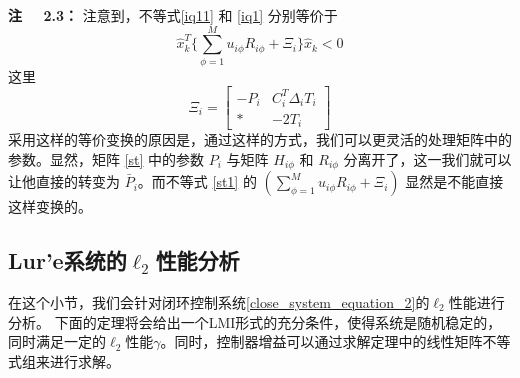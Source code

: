 	{\bf 注 \ \ 2.3：} 
	注意到，不等式\eqref{iq11} 和 \eqref{iq1} 分别等价于
	\begin{equation}\label{st1}
	\hat{x}^{T}_{k}\{\sum_{\phi=1}^{M}u_{i\phi}R_{i\phi}+\varXi_{i} \}\hat{x}_{k}<0
	\end{equation}
	这里
	\begin{equation*}
	\varXi_{i}=\begin{bmatrix}
	-P_{i}&C^{T}_{i}\varDelta_{i}T_{i}\\
	*&-2T_{i}
	\end{bmatrix}   
	\end{equation*}
	采用这样的等价变换的原因是，通过这样的方式，我们可以更灵活的处理矩阵中的参数。显然，矩阵 \eqref{st} 中的参数 $P_i$ 与矩阵 $H_{i\phi}$ 和 $R_{i\phi}$ 分离开了，这一我们就可以让他直接的转变为 $\bar{P}_{i}$。而不等式 \eqref{st1} 的 $(\sum_{\phi=1}^{M}u_{i\phi}R_{i\phi}+\varXi_{i})$ 显然是不能直接这样变换的。

\subsection{Lur'e系统的$\ell_2$性能分析}
	在这个小节，我们会针对闭环控制系统\eqref{close_system_equation_2}的$\ell_2$性能进行分析。 下面的定理将会给出一个LMI形式的充分条件，使得系统是随机稳定的，同时满足一定的$\ell_2$性能$\gamma$。同时，控制器增益可以通过求解定理中的线性矩阵不等式组来进行求解。
	
